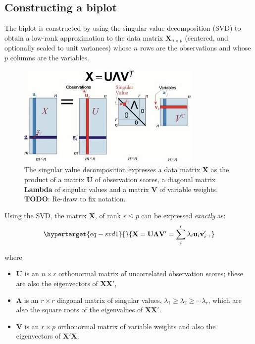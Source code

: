 \documentclass[
  letterpaper,
  10pt,
  krantz2]{krantz}
\providecommand{\tightlist}{%
  \setlength{\itemsep}{0pt}\setlength{\parskip}{0pt}}\usepackage{longtable,booktabs,array}
\begin{document}
\hypertarget{constructing-a-biplot}{%
\subsection{Constructing a biplot}\label{constructing-a-biplot}}

The biplot is constructed by using the singular value decomposition
(SVD) to obtain a low-rank approximation to the data matrix
\(\mathbf{X}_{n \times p}\) (centered, and optionally scaled to unit
variances) whose \(n\) rows are the observations and whose \(p\) columns
are the variables.

\begin{figure}

{\centering \includegraphics[width=0.8\textwidth,height=\textheight]{images/SVD-eqn.jpg}

}

\caption{\label{fig-svd-diagram}The singular value decomposition
expresses a data matrix \textbf{X} as the product of a matrix \textbf{U}
of observation scores, a diagonal matrix \textbf{Lambda} of singular
values and a matrix \textbf{V} of variable weights. \textbf{TODO}:
Re-draw to fix notation.}

\end{figure}

Using the SVD, the matrix \(\mathbf{X}\), of rank \(r \le p\) can be
expressed \emph{exactly} as:
\begin{equation}\protect\hypertarget{eq-svd1}{}{
\mathbf{X} = \mathbf{U} \mathbf{\Lambda} \mathbf{V}'
                 = \sum_i^r \lambda_i \mathbf{u}_i \mathbf{v}_i' \; ,
}\label{eq-svd1}\end{equation}

where

\begin{itemize}
\tightlist
\item
  \(\mathbf{U}\) is an \(n \times r\) orthonormal matrix of uncorrelated
  observation scores; these are also the eigenvectors of
  \(\mathbf{X} \mathbf{X}'\),
\item
  \(\mathbf{\Lambda}\) is an \(r \times r\) diagonal matrix of singular
  values, \(\lambda_1 \ge \lambda_2 \ge \cdots \lambda_r\), which are
  also the square roots of the eigenvalues of
  \(\mathbf{X} \mathbf{X}'\).
\item
  \(\mathbf{V}\) is an \(r \times p\) orthonormal matrix of variable
  weights and also the eigenvectors of \(\mathbf{X}' \mathbf{X}\).
\end{itemize}
\end{document}
